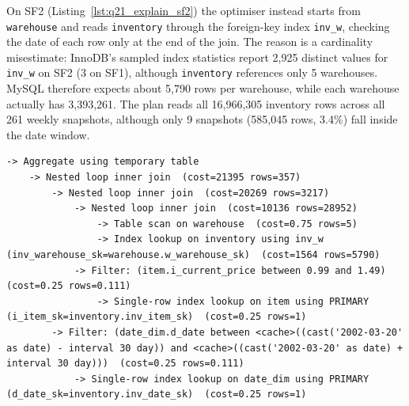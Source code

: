 \documentclass{ULBreport}
\begin{document}
On SF2 (Listing~\ref{lst:q21_explain_sf2}) the optimiser instead starts from \texttt{warehouse} and reads \texttt{inventory} through the foreign-key index \texttt{inv\_w}, checking the date of each row only at the end of the join. The reason is a cardinality misestimate: InnoDB's sampled index statistics report 2,925 distinct values for \texttt{inv\_w} on SF2 (3 on SF1), although \texttt{inventory} references only 5 warehouses. MySQL therefore expects about 5,790 rows per warehouse, while each warehouse actually has 3,393,261. The plan reads all 16,966,305 inventory rows across all 261 weekly snapshots, although only 9 snapshots (585,045 rows, 3.4\%) fall inside the date window.

\begin{lstlisting}[caption={Baseline \texttt{EXPLAIN FORMAT=TREE} on SF2 for Query 21 (top of plan omitted)}, label={lst:q21_explain_sf2}, basicstyle=\ttfamily\scriptsize, breaklines=true, frame=single]
-> Aggregate using temporary table
    -> Nested loop inner join  (cost=21395 rows=357)
        -> Nested loop inner join  (cost=20269 rows=3217)
            -> Nested loop inner join  (cost=10136 rows=28952)
                -> Table scan on warehouse  (cost=0.75 rows=5)
                -> Index lookup on inventory using inv_w (inv_warehouse_sk=warehouse.w_warehouse_sk)  (cost=1564 rows=5790)
            -> Filter: (item.i_current_price between 0.99 and 1.49)  (cost=0.25 rows=0.111)
                -> Single-row index lookup on item using PRIMARY (i_item_sk=inventory.inv_item_sk)  (cost=0.25 rows=1)
        -> Filter: (date_dim.d_date between <cache>((cast('2002-03-20' as date) - interval 30 day)) and <cache>((cast('2002-03-20' as date) + interval 30 day)))  (cost=0.25 rows=0.111)
            -> Single-row index lookup on date_dim using PRIMARY (d_date_sk=inventory.inv_date_sk)  (cost=0.25 rows=1)
\end{lstlisting}
\end{document}
